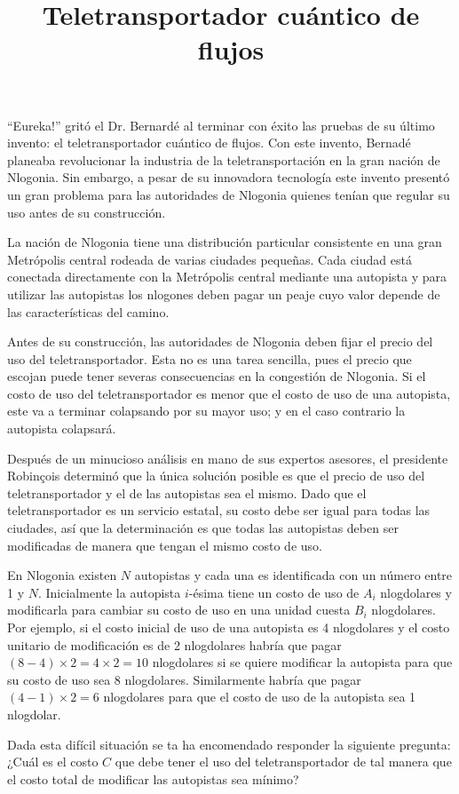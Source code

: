\documentclass{oci}
\title{Teletransportador cuántico de flujos}
\begin{document}
\begin{problemDescription}
  ``Eureka!'' gritó el Dr. Bernardé al terminar con éxito las pruebas de su
  último invento: el teletransportador cuántico de flujos.
  Con este invento, Bernadé planeaba revolucionar la industria de la
  teletransportación en la gran nación de Nlogonia.
  Sin embargo, a pesar de su innovadora tecnología este invento presentó un gran
  problema para las autoridades de Nlogonia quienes tenían que regular su uso
  antes de su construcción.

  La nación de Nlogonia tiene una distribución particular consistente en una gran
  Metrópolis central rodeada de varias ciudades pequeñas.
  Cada ciudad está conectada directamente con la Metrópolis central mediante
  una autopista y para utilizar las autopistas los nlogones deben pagar un peaje
  cuyo valor depende de las características del camino.

  Antes de su construcción, las autoridades de Nlogonia deben fijar el precio
  del uso del teletransportador.
  Esta no es una tarea sencilla, pues el precio que escojan puede tener severas
  consecuencias en la congestión de Nlogonia.
  Si el costo de uso del teletransportador es menor que el costo de uso de una
  autopista, este va a terminar colapsando por su mayor uso; y en el caso
  contrario la autopista colapsará.

  Después de un minucioso análisis en mano de sus expertos asesores, el
  presidente Robinçois determinó que la única solución posible es que el precio
  de uso del teletransportador y el de las autopistas sea el mismo.
  Dado que el teletransportador es un servicio estatal, su costo debe ser
  igual para todas las ciudades, así que la determinación es que todas las
  autopistas deben ser modificadas de manera que tengan el mismo costo de uso.

  En Nlogonia existen $N$ autopistas y cada una es identificada con un número
  entre 1 y $N$.
  Inicialmente la autopista $i$-ésima tiene un costo de uso de $A_i$ nlogdolares
  y modificarla para cambiar su costo de uso en una unidad cuesta $B_i$
  nlogdolares.
  Por ejemplo, si el costo inicial de uso de una autopista es 4 nlogdolares y
  el costo unitario de modificación es de 2 nlogdolares habría que pagar
  $(8-4)\times 2=4\times 2=10$ nlogdolares si se quiere modificar la autopista
  para que su costo de uso sea 8 nlogdolares.
  Similarmente habría que pagar $(4-1)\times 2=6$ nlogdolares para que el costo
  de uso de la autopista sea 1 nlogdolar.

  Dada esta difícil situación se ta ha encomendado responder la siguiente
  pregunta: ¿Cuál es el costo $C$ que debe tener el uso del teletransportador de
  tal manera que el costo total de modificar las autopistas sea mínimo?

\end{problemDescription}
\end{document}
